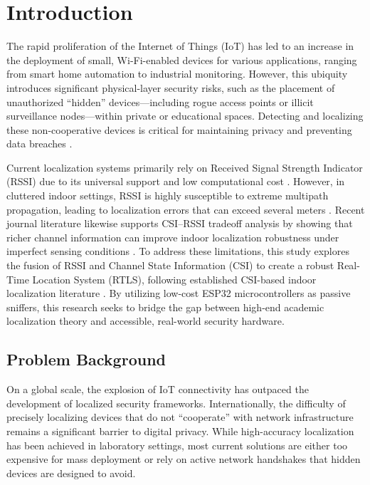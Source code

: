 \section{Introduction}
The rapid proliferation of the Internet of Things (IoT) has led to an increase in the deployment of small, Wi-Fi-enabled devices for various applications, ranging from smart home automation to industrial monitoring. However, this ubiquity introduces significant physical-layer security risks, such as the placement of unauthorized ``hidden'' devices—including rogue access points or illicit surveillance nodes—within private or educational spaces. Detecting and localizing these non-cooperative devices is critical for maintaining privacy and preventing data breaches \cite{ju2025hidden}.\smallskip

Current localization systems primarily rely on Received Signal Strength Indicator (RSSI) due to its universal support and low computational cost \cite{zaruba2007singleap}. However, in cluttered indoor settings, RSSI is highly susceptible to extreme multipath propagation, leading to localization errors that can exceed several meters \cite{yang2013rssi2csi,wu2012csi}. Recent journal literature likewise supports CSI--RSSI tradeoff analysis by showing that richer channel information can improve indoor localization robustness under imperfect sensing conditions \cite{li2024efficient,yang2021survey,leitch2023indoor}. To address these limitations, this study explores the fusion of RSSI and Channel State Information (CSI) to create a robust Real-Time Location System (RTLS), following established CSI-based indoor localization literature \cite{yang2013rssi2csi,wu2012csi,li2024efficient}. By utilizing low-cost ESP32 microcontrollers as passive sniffers, this research seeks to bridge the gap between high-end academic localization theory and accessible, real-world security hardware.\smallskip

\subsection{Problem Background}
On a global scale, the explosion of IoT connectivity has outpaced the development of localized security frameworks. Internationally, the difficulty of precisely localizing devices that do not ``cooperate'' with network infrastructure remains a significant barrier to digital privacy. While high-accuracy localization has been achieved in laboratory settings, most current solutions are either too expensive for mass deployment or rely on active network handshakes that hidden devices are designed to avoid.\smallskip

